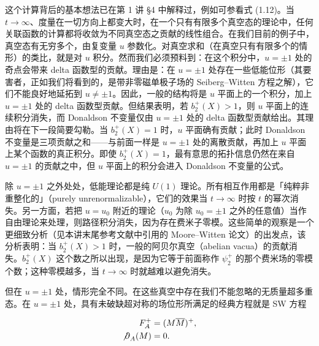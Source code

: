 这个计算背后的基本想法已在第 1 讲 §4 中解释过，例如可参看式 (1.12)。当 $t\to\infty$、度量在一切方向上都变大时，在一个只有有限多个真空态的理论中，任何关联函数的计算都将收敛为不同真空态之贡献的线性组合。在我们目前的例子中，真空态有无穷多个，由复变量 $u$ 参数化。对真空求和（在真空只有有限多个的情形）的类比，就是对 $u$ 积分。然而我们必须预料到：在这个积分中，$u=\pm1$ 处的奇点会带来 delta 函数型的贡献。理由是：在 $u=\pm1$ 处存在一些低能位形（其要害者，正如我们将看到的，是带非零磁单极子场的 Seiberg--Witten 方程之解），它们不能良好地延拓到 $u\neq\pm1$。因此，一般的结构将是 $u$ 平面上的一个积分，加上 $u=\pm1$ 处的 delta 函数型贡献。但结果表明，若 $b_2^+(X)>1$，则 $u$ 平面上的连续积分消失，而 Donaldson 不变量仅由 $u=\pm1$ 处的 delta 函数型贡献给出。其理由将在下一段简要勾勒。当 $b_2^+(X)=1$ 时，$u$ 平面确有贡献；此时 Donaldson 不变量是三项贡献之和——与前面一样是 $u=\pm1$ 处的离散贡献，再加上 $u$ 平面上某个函数的真正积分。即使 $b_2^+(X)=1$，最有意思的拓扑信息仍然在来自 $u=\pm1$ 的贡献之中，但 $u$ 平面上的积分会进入 Donaldson 不变量的公式。

除 $u=\pm1$ 之外处处，低能理论都是纯 $U(1)$ 理论。所有相互作用都是「纯粹非重整化的」（purely unrenormalizable），它们的效果当 $t\to\infty$ 时按 $t$ 的幂次消失。另一方面，若把 $u=u_0$ 附近的理论（$u_0$ 为除 $u_0=\pm1$ 之外的任意值）当作自由理论来处理，则路径积分消失，因为存在费米子零模。这些简单的观察是一个更细致分析（见本讲末尾参考文献中引用的 Moore--Witten 论文）的出发点，该分析表明：当 $b_2^+(X)>1$ 时，一般的阿贝尔真空（abelian vacua）的贡献消失。$b_2^+(X)$ 这个数之所以出现，是因为它等于前面称作 $\psi_2^+$ 的那个费米场的零模个数；这种零模越多，当 $t\to\infty$ 时就越难以避免消失。


但在 $u=\pm1$ 处，情形完全不同。在这些真空中存在我们不能忽略的无质量超多重态。在 $u=\pm1$ 处，具有未破缺超对称的场位形所满足的经典方程就是 SW 方程

\[
\begin{aligned}
  F_A^+&=(M\overline M)^+,\\
  {\not\partial}_A(M)&=0.
\end{aligned}
\]

